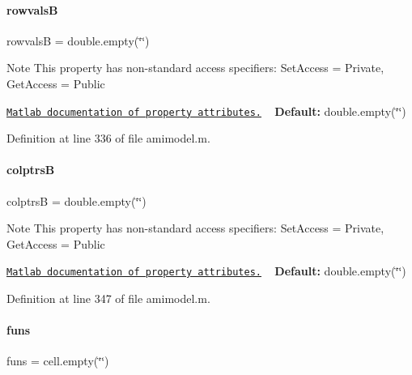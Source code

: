 \paragraph{\texorpdfstring{rowvalsB}{rowvalsB}}
{\footnotesize\ttfamily rowvalsB = double.\+empty(\char`\"{}\char`\"{})}

\begin{DoxyNote}{Note}
This property has non-\/standard access specifiers\+: {\ttfamily Set\+Access = Private, Get\+Access = Public} 

\href{http://www.mathworks.com/help/matlab/matlab_oop/property-attributes.html}{\tt Matlab documentation of property attributes.} ~\newline
{\bfseries Default\+:} double.\+empty(\char`\"{}\char`\"{}) 
\end{DoxyNote}


Definition at line 336 of file amimodel.\+m.

\mbox{\label{classamimodel_a3a4891c5565b544dd7d4362dbbfaadf7}} 
\paragraph{\texorpdfstring{colptrsB}{colptrsB}}
{\footnotesize\ttfamily colptrsB = double.\+empty(\char`\"{}\char`\"{})}

\begin{DoxyNote}{Note}
This property has non-\/standard access specifiers\+: {\ttfamily Set\+Access = Private, Get\+Access = Public} 

\href{http://www.mathworks.com/help/matlab/matlab_oop/property-attributes.html}{\tt Matlab documentation of property attributes.} ~\newline
{\bfseries Default\+:} double.\+empty(\char`\"{}\char`\"{}) 
\end{DoxyNote}


Definition at line 347 of file amimodel.\+m.

\mbox{\label{classamimodel_af80b2560853c3df2b09fef2a198cf5b8}} 
\paragraph{\texorpdfstring{funs}{funs}}
{\footnotesize\ttfamily funs = cell.\+empty(\char`\"{}\char`\"{})}

